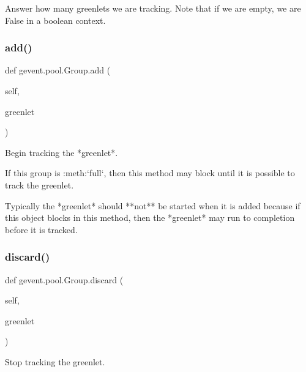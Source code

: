 \begin{DoxyVerb}Answer how many greenlets we are tracking. Note that if we are empty,
we are False in a boolean context.
\end{DoxyVerb}
 \mbox{\label{classgevent_1_1pool_1_1_group_a2e4dea7c78ceebc47140efd42b420b73}} 
\subsubsection{\texorpdfstring{add()}{add()}}
{\footnotesize\ttfamily def gevent.\+pool.\+Group.\+add (\begin{DoxyParamCaption}\item[{}]{self,  }\item[{}]{greenlet }\end{DoxyParamCaption})}

\begin{DoxyVerb}Begin tracking the *greenlet*.

If this group is :meth:`full`, then this method may block
until it is possible to track the greenlet.

Typically the *greenlet* should **not** be started when
it is added because if this object blocks in this method,
then the *greenlet* may run to completion before it is tracked.
\end{DoxyVerb}
 \mbox{\label{classgevent_1_1pool_1_1_group_a72d55b247f93a2ce245f579e39e489a0}} 
\subsubsection{\texorpdfstring{discard()}{discard()}}
{\footnotesize\ttfamily def gevent.\+pool.\+Group.\+discard (\begin{DoxyParamCaption}\item[{}]{self,  }\item[{}]{greenlet }\end{DoxyParamCaption})}

\begin{DoxyVerb}Stop tracking the greenlet.
\end{DoxyVerb}
 \mbox{\label{classgevent_1_1pool_1_1_group_a60ab870aee8f8e804b272e4b36d8a4fc}} 
